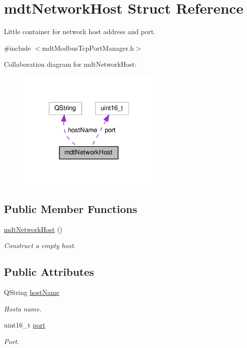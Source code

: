 \hypertarget{structmdt_network_host}{\section{mdt\-Network\-Host Struct Reference}
\label{structmdt_network_host}
}


Little container for network host address and port.  




{\ttfamily \#include $<$mdt\-Modbus\-Tcp\-Port\-Manager.\-h$>$}



Collaboration diagram for mdt\-Network\-Host\-:
\nopagebreak
\begin{figure}[H]
\begin{center}
\leavevmode
\includegraphics[width=202pt]{structmdt_network_host__coll__graph}
\end{center}
\end{figure}
\subsection*{Public Member Functions}
\begin{DoxyCompactItemize}
\item 
\hyperlink{structmdt_network_host_ad5a36b38053535e05fc605eadb182f61}{mdt\-Network\-Host} ()
\begin{DoxyCompactList}\small\item\em Construct a empty host. \end{DoxyCompactList}\end{DoxyCompactItemize}
\subsection*{Public Attributes}
\begin{DoxyCompactItemize}
\item 
Q\-String \hyperlink{structmdt_network_host_ad3c2f4bfb8b82b2d0f22ef60d7cc9ca2}{host\-Name}
\begin{DoxyCompactList}\small\item\em Hosta name. \end{DoxyCompactList}\item 
uint16\-\_\-t \hyperlink{structmdt_network_host_aa6c1fee525513ea51948add0c1d05034}{port}
\begin{DoxyCompactList}\small\item\em Port. \end{DoxyCompactList}\end{DoxyCompactItemize}


